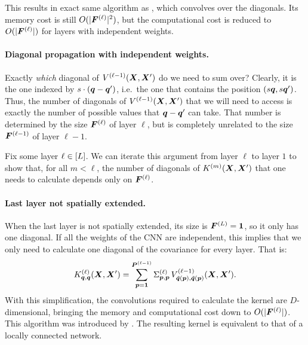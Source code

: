 \documentclass[accepted]{uai2021} %
\newcommand{\layersizebase}{\vF}
\newcommand{\layersize}[1]{{\layersizebase^{\bra{#1}}}}
\newcommand{\patchsizebase}{\vP}
\newcommand{\patchsize}[1]{{\patchsizebase^{\bra{#1}}}}
\newcommand{\patchf}[2]{{\tilde#1\bra{#2}}}
\newcommand{\priorWcovs}[1]{\Sigma^{(#1)}}
\newcommand{\patch}{\vp}               %
\newcommand{\nextpatch}{\vq}
\newcommand{\covf}[1]{K\ssup{#1}}
\newcommand{\nlinf}[1]{V\ssup{#1}}
\newcommand{\0}{\boldsymbol{0}}
\newcommand{\1}{\boldsymbol{1}}
\begin{document}
This results in exact same algorithm as \citet{arora2019exact}, which convolves over the diagonals. Its memory cost is still $O(\absshort{\layersize{\ell}}^{2})$, but the computational cost is reduced to $O(\absshort{\layersize{\ell}})$ for layers with independent weights.

\paragraph{Diagonal propagation with independent weights.}
Exactly \emph{which} diagonal of $\nlinf{\ell-1}\bra{\mX, \mX'}$ do we need to sum over? Clearly, it is the one indexed by $s\cdot\bra{\nextpatch - \nextpatch'}$, i.e.~the one that contains the position $\bra{s\nextpatch, s\nextpatch'}$. Thus, the number of diagonals of $\nlinf{\ell-1}\bra{\mX, \mX'}$ that we will need to access is exactly the number of possible values that $\nextpatch-\nextpatch'$ can take. That number is determined by the size $\layersize{\ell}$ of layer $\ell$, but is completely unrelated to the size $\layersize{\ell-1}$ of layer $\ell-1$.

Fix some layer $\ell\in[L]$.
We can iterate this argument from layer $\ell$ to layer $1$ to show that, for all $m < \ell$, the number of diagonals of $\covf{m}\bra{\mX,\mX'}$ that one needs to calculate depends only on $\layersize{\ell}$.

\paragraph{Last layer not spatially extended.} When the last layer is not spatially extended, its size is $\layersize{L}=\1$, so it only has one diagonal. If all the weights of the CNN are independent, this implies that we only need to calculate one diagonal of the covariance for every layer. That is:
\begin{equation}
\covf{\ell}_{\nextpatch,\nextpatch}\bra{\mX, \mX'} =
\sum_{\patch=\1}^{\patchsize{\ell-1}}
\priorWcovs{\ell}_{\patch,\patch} \,
\nlinf{\ell-1}_{\patchf{\nextpatch}{\patch},\patchf{\nextpatch}{\patch}}\bra{\mX, \mX'}.
\label{eq:cnn-kernel-independent-diagonal}
\end{equation}
With this simplification, the convolutions required to calculate the kernel are
$D$-dimensional, bringing the memory and computational cost down to $O(\absshort{\layersize{\ell}})$. This algorithm was introduced by \citet{garriga2018infiniteconv}. The resulting kernel is equivalent to that of a locally connected network.
\end{document}
